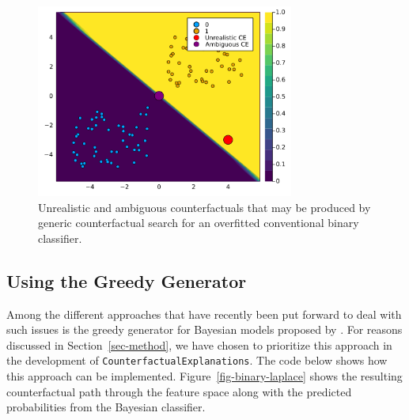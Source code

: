 \documentclass{juliacon}
\begin{document}
\begin{figure}

{\centering \includegraphics[width=3.33333in,height=2.5in]{www/binary_wrong.png}

}

\caption{\label{fig-binary-wrong}Unrealistic and ambiguous
counterfactuals that may be produced by generic counterfactual search
for an overfitted conventional binary classifier.}

\end{figure}

\hypertarget{using-the-greedy-generator}{%
\subsection{Using the Greedy
Generator}\label{using-the-greedy-generator}}

Among the different approaches that have recently been put forward to
deal with such issues is the greedy generator for Bayesian models
proposed by \cite{schut2021generating}. For reasons discussed in
Section~\ref{sec-method}, we have chosen to prioritize this approach in
the development of \texttt{CounterfactualExplanations}. The code below
shows how this approach can be implemented.
Figure~\ref{fig-binary-laplace} shows the resulting counterfactual path
through the feature space along with the predicted probabilities from
the Bayesian classifier.
\end{document}

